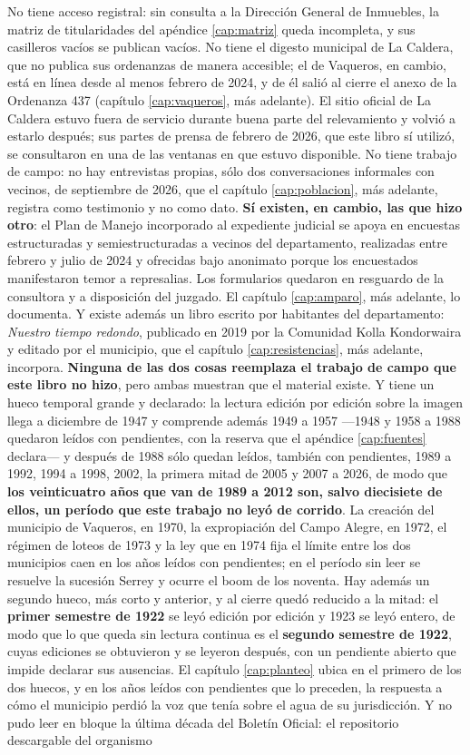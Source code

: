 No tiene acceso registral: sin consulta a la Dirección General de Inmuebles, la matriz de titularidades del apéndice \ref{cap:matriz} queda incompleta, y sus casilleros vacíos se publican vacíos. No tiene el digesto municipal de La Caldera, que no publica sus ordenanzas de manera accesible; el de Vaqueros, en cambio, está en línea desde al menos febrero de 2024, y de él salió al cierre el anexo de la Ordenanza 437 (capítulo \ref{cap:vaqueros}, más adelante). El sitio oficial de La Caldera estuvo fuera de servicio durante buena parte del relevamiento y volvió a estarlo después; sus partes de prensa de febrero de 2026, que este libro sí utilizó, se consultaron en una de las ventanas en que estuvo disponible. No tiene trabajo de campo: no hay entrevistas propias, sólo dos conversaciones informales con vecinos, de septiembre de 2026, que el capítulo \ref{cap:poblacion}, más adelante, registra como testimonio y no como dato. \textbf{Sí existen, en cambio, las que hizo otro}: el Plan de Manejo incorporado al expediente judicial se apoya en encuestas estructuradas y semiestructuradas a vecinos del departamento, realizadas entre febrero y julio de 2024 y ofrecidas bajo anonimato porque los encuestados manifestaron temor a represalias. Los formularios quedaron en resguardo de la consultora y a disposición del juzgado. El capítulo \ref{cap:amparo}, más adelante, lo documenta. Y existe además un libro escrito por habitantes del departamento: \textit{Nuestro tiempo redondo}, publicado en 2019 por la Comunidad Kolla Kondorwaira y editado por el municipio, que el capítulo \ref{cap:resistencias}, más adelante, incorpora. \textbf{Ninguna de las dos cosas reemplaza el trabajo de campo que este libro no hizo}, pero ambas muestran que el material existe. Y tiene un hueco temporal grande y declarado: la lectura edición por edición sobre la imagen llega a diciembre de 1947 y comprende además 1949 a 1957 ---1948 y 1958 a 1988 quedaron leídos con pendientes, con la reserva que el apéndice \ref{cap:fuentes} declara--- y después de 1988 sólo quedan leídos, también con pendientes, 1989 a 1992, 1994 a 1998, 2002, la primera mitad de 2005 y 2007 a 2026, de modo que \textbf{los veinticuatro años que van de 1989 a 2012 son, salvo diecisiete de ellos, un período que este trabajo no leyó de corrido}. La creación del municipio de Vaqueros, en 1970, la expropiación del Campo Alegre, en 1972, el régimen de loteos de 1973 y la ley que en 1974 fija el límite entre los dos municipios caen en los años leídos con pendientes; en el período sin leer se resuelve la sucesión Serrey y ocurre el boom de los noventa. Hay además un segundo hueco, más corto y anterior, y al cierre quedó reducido a la mitad: el \textbf{primer semestre de 1922} se leyó edición por edición y 1923 se leyó entero, de modo que lo que queda sin lectura continua es el \textbf{segundo semestre de 1922}, cuyas ediciones se obtuvieron y se leyeron después, con un pendiente abierto que impide declarar sus ausencias. El capítulo \ref{cap:planteo} ubica en el primero de los dos huecos, y en los años leídos con pendientes que lo preceden, la respuesta a cómo el municipio perdió la voz que tenía sobre el agua de su jurisdicción. Y no pudo leer en bloque la última década del Boletín Oficial: el repositorio descargable del organismo 